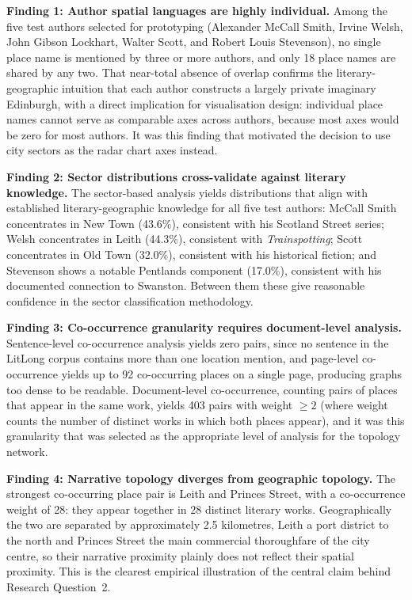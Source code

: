 \documentclass[logo,msc]{infthesis}
\begin{document}
\textbf{Finding 1: Author spatial languages are highly individual.} Among the five test authors selected for prototyping (Alexander McCall Smith, Irvine Welsh, John Gibson Lockhart, Walter Scott, and Robert Louis Stevenson), no single place name is mentioned by three or more authors, and only 18 place names are shared by any two. That near-total absence of overlap confirms the literary-geographic intuition that each author constructs a largely private imaginary Edinburgh, with a direct implication for visualisation design: individual place names cannot serve as comparable axes across authors, because most axes would be zero for most authors. It was this finding that motivated the decision to use city sectors as the radar chart axes instead.
 
\textbf{Finding 2: Sector distributions cross-validate against literary knowledge.} The sector-based analysis yields distributions that align with established literary-geographic knowledge for all five test authors: McCall Smith concentrates in New Town (43.6\%), consistent with his Scotland Street series; Welsh concentrates in Leith (44.3\%), consistent with \textit{Trainspotting}; Scott concentrates in Old Town (32.0\%), consistent with his historical fiction; and Stevenson shows a notable Pentlands component (17.0\%), consistent with his documented connection to Swanston. Between them these give reasonable confidence in the sector classification methodology.

\textbf{Finding 3: Co-occurrence granularity requires document-level analysis.} Sentence-level co-occurrence analysis yields zero pairs, since no sentence in the LitLong corpus contains more than one location mention, and page-level co-occurrence yields up to 92 co-occurring places on a single page, producing graphs too dense to be readable. Document-level co-occurrence, counting pairs of places that appear in the same work, yields 403 pairs with weight $\geq 2$ (where weight counts the number of distinct works in which both places appear), and it was this granularity that was selected as the appropriate level of analysis for the topology network.

\textbf{Finding 4: Narrative topology diverges from geographic topology.} The strongest co-occurring place pair is Leith and Princes Street, with a co-occurrence weight of 28: they appear together in 28 distinct literary works. Geographically the two are separated by approximately 2.5 kilometres, Leith a port district to the north and Princes Street the main commercial thoroughfare of the city centre, so their narrative proximity plainly does not reflect their spatial proximity. This is the clearest empirical illustration of the central claim behind Research Question~2.
 
\end{document}
